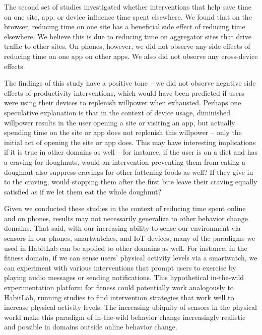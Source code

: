 The second set of studies investigated whether interventions that help save time on one site, app, or device influence time spent elsewhere. We found that on the browser, reducing time on one site has a beneficial side effect of reducing time elsewhere. We believe this is due to reducing time on aggregator sites that drive traffic to other sites. On phones, however, we did not observe any side effects of reducing time on one app on other apps. We also did not observe any cross-device effects.

The findings of this study have a positive tone -- we did not observe negative side effects of productivity interventions, which would have been predicted if users were using their devices to replenish willpower when exhausted. Perhaps one speculative explanation is that in the context of device usage, diminished willpower results in the user opening a site or visiting an app, but actually spending time on the site or app does not replenish this willpower -- only the initial act of opening the site or app does. This may have interesting implications if it is true in other domains as well -- for instance, if the user is on a diet and has a craving for doughnuts, would an intervention preventing them from eating a doughnut also suppress cravings for other fattening foods as well? If they give in to the craving, would stopping them after the first bite leave their craving equally satisfied as if we let them eat the whole doughnut?

Given we conducted these studies in the context of reducing time spent online and on phones, results may not necessarily generalize to other behavior change domains. That said, with our increasing ability to sense our environment via sensors in our phones, smartwatches, and IoT devices, many of the paradigms we used in HabitLab can be applied to other domains as well. For instance, in the fitness domain, if we can sense users' physical activity levels via a smartwatch, we can experiment with various interventions that prompt users to exercise by playing audio messages or sending notifications. This hypothetical in-the-wild experimentation platform for fitness could potentially work analogously to HabitLab, running studies to find intervention strategies that work well to increase physical activity levels. The increasing ubiquity of sensors in the physical world make this paradigm of in-the-wild behavior change increasingly realistic and possible in domains outside online behavior change.

